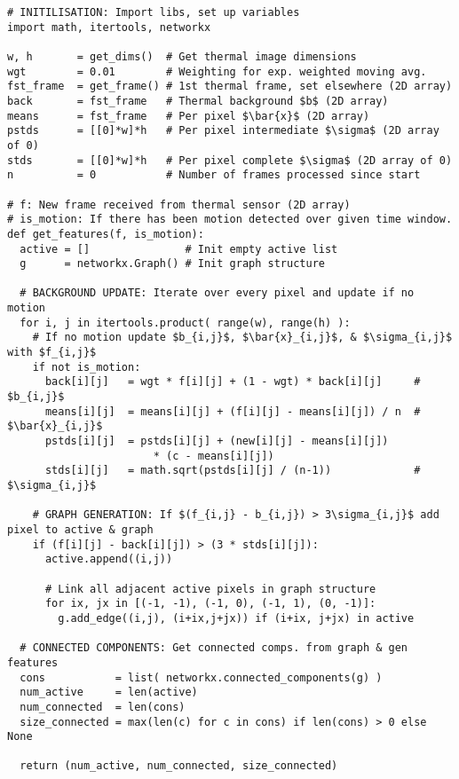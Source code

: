 \begin{verbatim}
# INITILISATION: Import libs, set up variables
import math, itertools, networkx

w, h       = get_dims()  # Get thermal image dimensions
wgt        = 0.01        # Weighting for exp. weighted moving avg.
fst_frame  = get_frame() # 1st thermal frame, set elsewhere (2D array)
back       = fst_frame   # Thermal background $b$ (2D array)
means      = fst_frame   # Per pixel $\bar{x}$ (2D array)
pstds      = [[0]*w]*h   # Per pixel intermediate $\sigma$ (2D array of 0) 
stds       = [[0]*w]*h   # Per pixel complete $\sigma$ (2D array of 0)
n          = 0           # Number of frames processed since start

# f: New frame received from thermal sensor (2D array)
# is_motion: If there has been motion detected over given time window.
def get_features(f, is_motion):
  active = []               # Init empty active list
  g      = networkx.Graph() # Init graph structure

  # BACKGROUND UPDATE: Iterate over every pixel and update if no motion
  for i, j in itertools.product( range(w), range(h) ):
    # If no motion update $b_{i,j}$, $\bar{x}_{i,j}$, & $\sigma_{i,j}$  with $f_{i,j}$  
    if not is_motion:
      back[i][j]   = wgt * f[i][j] + (1 - wgt) * back[i][j]     # $b_{i,j}$
      means[i][j]  = means[i][j] + (f[i][j] - means[i][j]) / n  # $\bar{x}_{i,j}$
      pstds[i][j]  = pstds[i][j] + (new[i][j] - means[i][j])
                       * (c - means[i][j])
      stds[i][j]   = math.sqrt(pstds[i][j] / (n-1))             # $\sigma_{i,j}$
        
    # GRAPH GENERATION: If $(f_{i,j} - b_{i,j}) > 3\sigma_{i,j}$ add pixel to active & graph
    if (f[i][j] - back[i][j]) > (3 * stds[i][j]):
      active.append((i,j))

      # Link all adjacent active pixels in graph structure
      for ix, jx in [(-1, -1), (-1, 0), (-1, 1), (0, -1)]:
        g.add_edge((i,j), (i+ix,j+jx)) if (i+ix, j+jx) in active

  # CONNECTED COMPONENTS: Get connected comps. from graph & gen features
  cons           = list( networkx.connected_components(g) )
  num_active     = len(active)
  num_connected  = len(cons)
  size_connected = max(len(c) for c in cons) if len(cons) > 0 else None

  return (num_active, num_connected, size_connected)
\end{verbatim}